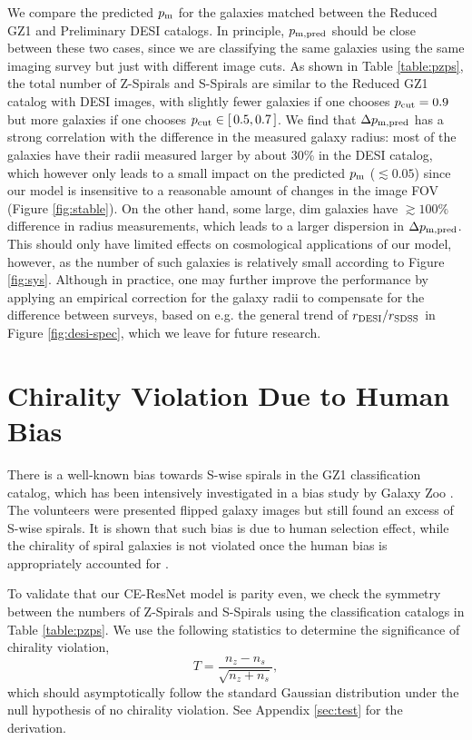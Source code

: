 \documentclass[twocolumn]{aastex631}
\begin{document}
We compare the predicted $p_{\rm m}$ for the galaxies matched between the Reduced GZ1 and Preliminary DESI catalogs.
In principle, $p_{\rm m,pred}$ should be close between these two cases, since we are classifying the same galaxies using the same imaging survey but just with different image cuts.
As shown in Table \ref{table:pzps}, the total number of Z-Spirals and S-Spirals are similar to the Reduced GZ1 catalog with DESI images, with slightly fewer galaxies if one chooses $p_{\rm cut}=0.9$ but more galaxies if one chooses $p_{\rm cut}\in[\,0.5,0.7\,]$.
We find that $\Delta p_{\rm m,pred}$ has a strong correlation with the difference in the measured galaxy radius: most of the galaxies have their radii measured larger by about 30\% in the DESI catalog, which however only leads to a small impact on the predicted $p_{\rm m}$ ($\lesssim 0.05$) since our model is insensitive to a reasonable amount of changes in the image FOV (Figure \ref{fig:stable}).
On the other hand, some large, dim galaxies have $\gtrsim 100\%$ difference in radius measurements, which leads to a larger dispersion in $\Delta p_{\rm m,pred}$.
This should only have limited effects on cosmological applications of our model, however, as the number of such galaxies is relatively small according to Figure \ref{fig:sys}.
Although in practice, one may further improve the performance by applying an empirical correction for the galaxy radii to compensate for the difference between surveys, based on e.g. the general trend of $r_{\rm DESI}/r_{\rm SDSS}$ in Figure \ref{fig:desi-spec}, which we leave for future research.


\section{Chirality Violation Due to Human Bias}

\label{sec:violation}

There is a well-known bias towards S-wise spirals in the GZ1 classification catalog, which has been intensively investigated in a bias study by Galaxy Zoo \citep{lintott2008galaxy,lintott2011galaxy}.
The volunteers were presented flipped galaxy images but still found an excess of S-wise spirals.
It is shown that such bias is due to human selection effect, while the chirality of spiral galaxies is not violated once the human bias is appropriately accounted for \citep{land2008galaxy,hayes2017nature}.

To validate that our CE-ResNet model is parity even, we check the symmetry between the numbers of Z-Spirals and S-Spirals using the classification catalogs in Table \ref{table:pzps}.
We use the following statistics to determine the significance of chirality violation,
\begin{equation}
    T = \frac{n_z-n_s}{\sqrt{n_z+n_s}},
    \label{EQ:TEST}
\end{equation}
which should asymptotically follow the standard Gaussian distribution under the null hypothesis of no chirality violation.
See Appendix \ref{sec:test} for the derivation.
\end{document}
